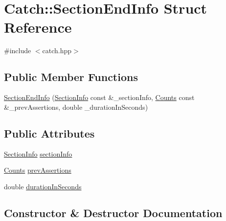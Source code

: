 \hypertarget{structCatch_1_1SectionEndInfo}{}\section{Catch\+:\+:Section\+End\+Info Struct Reference}
\label{structCatch_1_1SectionEndInfo}


{\ttfamily \#include $<$catch.\+hpp$>$}

\subsection*{Public Member Functions}
\begin{DoxyCompactItemize}
\item 
\mbox{\hyperlink{structCatch_1_1SectionEndInfo_abc9381c7c22b6907317ec985ccaa6713}{Section\+End\+Info}} (\mbox{\hyperlink{structCatch_1_1SectionInfo}{Section\+Info}} const \&\+\_\+section\+Info, \mbox{\hyperlink{structCatch_1_1Counts}{Counts}} const \&\+\_\+prev\+Assertions, double \+\_\+duration\+In\+Seconds)
\end{DoxyCompactItemize}
\subsection*{Public Attributes}
\begin{DoxyCompactItemize}
\item 
\mbox{\hyperlink{structCatch_1_1SectionInfo}{Section\+Info}} \mbox{\hyperlink{structCatch_1_1SectionEndInfo_a2d44793392cb83735d086d726822abe9}{section\+Info}}
\item 
\mbox{\hyperlink{structCatch_1_1Counts}{Counts}} \mbox{\hyperlink{structCatch_1_1SectionEndInfo_ae70b154cbc05b5dd2901d97f89303d8c}{prev\+Assertions}}
\item 
double \mbox{\hyperlink{structCatch_1_1SectionEndInfo_a7c262f2dab9cff166b8eca620c47eea5}{duration\+In\+Seconds}}
\end{DoxyCompactItemize}


\subsection{Constructor \& Destructor Documentation}
\mbox{\label{structCatch_1_1SectionEndInfo_abc9381c7c22b6907317ec985ccaa6713}} 
